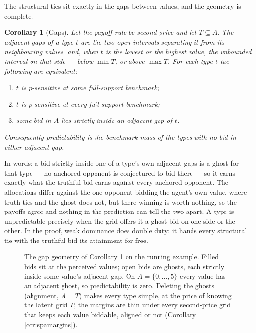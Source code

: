 \documentclass[12pt]{article}
\newtheorem{corollary}{Corollary}
\theoremstyle{definition}
\begin{document}
The structural ties sit exactly in the gaps between values, and the geometry is complete.

\begin{corollary}[Gaps]\label{th:gaps}
Let the payoff rule be second-price and let $T \subseteq A$. The \emph{adjacent gaps} of a type $t$ are the two open intervals separating it from its neighbouring values, and, when $t$ is the lowest or the highest value, the unbounded interval on that side --- below $\min T$, or above $\max T$. For each type $t$ the following are equivalent:
\begin{enumerate}
\item[i.] $t$ is $p$-sensitive at some full-support benchmark;
\item[ii.] $t$ is $p$-sensitive at every full-support benchmark;
\item[iii.] some bid in $A$ lies strictly inside an adjacent gap of $t$.
\end{enumerate}
Consequently predictability is the benchmark mass of the types with no bid in either adjacent gap.
\end{corollary}

In words: a bid strictly inside one of a type's own adjacent gaps is a ghost for that type --- no anchored opponent is conjectured to bid there --- so it earns exactly what the truthful bid earns against every anchored opponent. The allocations differ against the one opponent bidding the agent's own value, where truth ties and the ghost does not, but there winning is worth nothing, so the payoffs agree and nothing in the prediction can tell the two apart. A type is unpredictable precisely when the grid offers it a ghost bid on one side or the other. In the proof, weak dominance does double duty: it hands every structural tie with the truthful bid its attainment for free.

\begin{figure}[H]
\centering
{}
\caption{The gap geometry of Corollary \ref{th:gaps} on the running example. Filled bids sit at the perceived values; open bids are ghosts, each strictly inside some value's adjacent gap. On $A = \{0, \dots, 5\}$ every value has an adjacent ghost, so predictability is zero. Deleting the ghosts (alignment, $A = T$) makes every type simple, at the price of knowing the latent grid $T$; the margins are thin under every second-price grid that keeps each value biddable, aligned or not (Corollary \ref{cor:spamargins}).}
\label{fig:gaps}
\end{figure}
\end{document}
